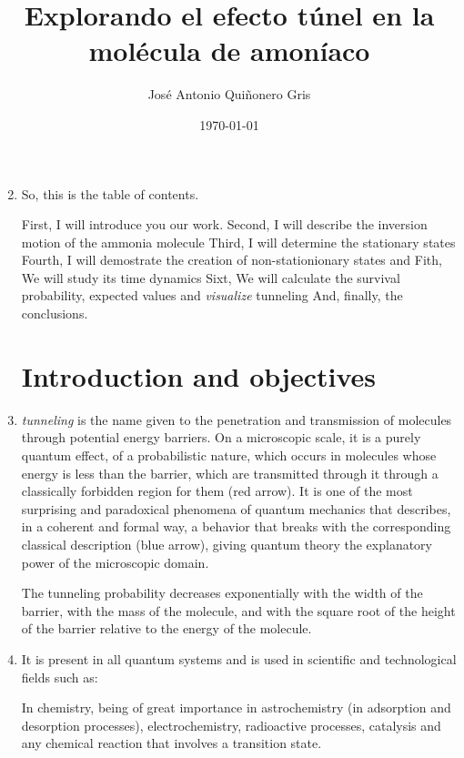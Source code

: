\documentclass[12pt, a4paper]{article}
\author{José Antonio Quiñonero Gris}
\title{\textbf{Explorando el efecto túnel en la molécula de amoníaco}}
\date{\today}
\begin{document}
\maketitle

\begin{enumerate}[label=\textbf{Slide \arabic*.}]
    \setcounter{enumi}{1} %
    \item So, this is the table of contents.

        First, I will introduce you our work.
        Second, I will describe the inversion motion of the ammonia molecule
        Third, I will determine the stationary states
        Fourth, I will demostrate the creation of non-stationionary states and
        Fith, We will study its time dynamics
        Sixt, We will calculate the survival probability, expected values and \textit{visualize} tunneling
        And, finally, the conclusions.
    \section{Introduction and objectives}

    \item \textit{tunneling} is the name given to the penetration and transmission of molecules through potential energy barriers. On a microscopic scale, it is a purely quantum effect, of a probabilistic nature, which occurs in molecules whose energy is less than the barrier, which are transmitted through it through a classically forbidden region for them (red arrow). It is one of the most surprising and paradoxical phenomena of quantum mechanics that describes, in a coherent and formal way, a behavior that breaks with the corresponding classical description (blue arrow), giving quantum theory the explanatory power of the microscopic domain.

        The tunneling probability decreases exponentially with the width of the barrier, with the mass of the molecule, and with the square root of the height of the barrier relative to the energy of the molecule.

    \item It is present in all quantum systems and is used in scientific and technological fields such as:

         In chemistry, being of great importance in astrochemistry (in adsorption and desorption processes), electrochemistry, radioactive processes, catalysis and any chemical reaction that involves a transition state.


\end{enumerate}
\end{document}
